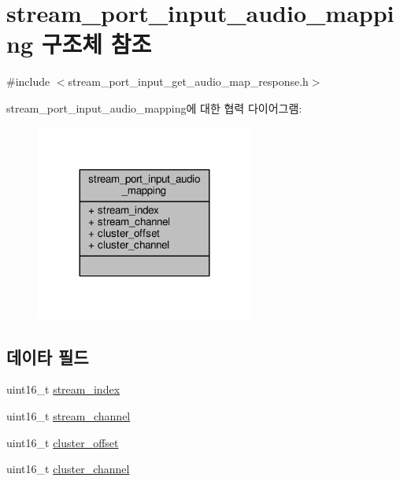 \hypertarget{structavdecc__lib_1_1stream__port__input__audio__mapping}{}\section{stream\+\_\+port\+\_\+input\+\_\+audio\+\_\+mapping 구조체 참조}
\label{structavdecc__lib_1_1stream__port__input__audio__mapping}


{\ttfamily \#include $<$stream\+\_\+port\+\_\+input\+\_\+get\+\_\+audio\+\_\+map\+\_\+response.\+h$>$}



stream\+\_\+port\+\_\+input\+\_\+audio\+\_\+mapping에 대한 협력 다이어그램\+:
\nopagebreak
\begin{figure}[H]
\begin{center}
\leavevmode
\includegraphics[width=203pt]{structavdecc__lib_1_1stream__port__input__audio__mapping__coll__graph}
\end{center}
\end{figure}
\subsection*{데이타 필드}
\begin{DoxyCompactItemize}
\item 
uint16\+\_\+t \hyperlink{structavdecc__lib_1_1stream__port__input__audio__mapping_acad3919f1d34fc0ae26a5508175defb1}{stream\+\_\+index}
\item 
uint16\+\_\+t \hyperlink{structavdecc__lib_1_1stream__port__input__audio__mapping_a99de82258f8163098a8ff558abf07af7}{stream\+\_\+channel}
\item 
uint16\+\_\+t \hyperlink{structavdecc__lib_1_1stream__port__input__audio__mapping_ad255a47e83b1a3056865a81c5f3a2545}{cluster\+\_\+offset}
\item 
uint16\+\_\+t \hyperlink{structavdecc__lib_1_1stream__port__input__audio__mapping_ad7ad28dde5b77668bff26372dab9ea76}{cluster\+\_\+channel}
\end{DoxyCompactItemize}


